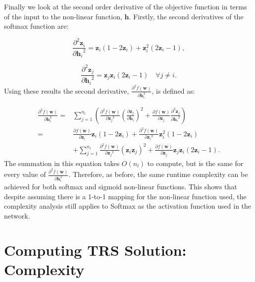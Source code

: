 \documentclass[letterpaper,12pt,titlepage,oneside,final]{book}
\begin{document}
	Finally we look at the second order derivative of the objective function in terms of the input to the non-linear function, $\mathbf{h}$. Firstly, the second derivatives of the softmax function are:
	
	\begin{equation}
	\frac{\partial^{2}{\mathbf{z}_{i}}}{\partial{\mathbf{h}_{i}}^{2}} = \mathbf{z}_{i}(1 - 2\mathbf{z}_{i}) + \mathbf{z}_{i}^2(2\mathbf{z}_{i} - 1) ,
	\end{equation}
	
	\begin{equation}
	\frac{\partial^{2}{\mathbf{z}_{j}}}{\partial{\mathbf{h}_{i}}^{2}} = \mathbf{z}_{j}\mathbf{z}_{i}(2\mathbf{z}_{i}-1) \quad \forall j \neq i.
	\end{equation}
	Using these results the second derivative, $\frac{\partial^{2}{f(\mathbf{w})}}{\partial{\mathbf{h}_{i}^{2}}}$, is defined as:
	
	\begin{equation}
	\begin{split}
	\frac{\partial^{2}{f(\mathbf{w})}}{\partial{\mathbf{h}_{i}^{2}}} = &\sum_{j = 1}^{n_{l}}({\frac{\partial^{2}{f(\mathbf{w})}}{\partial{\mathbf{z}_{j}}^{2}}(\frac{\partial{\mathbf{z}_{j}}}{\partial{\mathbf{h}_{i}}})^{2} +\frac{\partial{f(\mathbf{w})}}{\partial{\mathbf{z}_{j}}}\frac{\partial^{2}{\mathbf{z}_{j}}}{\partial{\mathbf{h}_{i}}^{2}}}) \\ = & \frac{\partial{f(\mathbf{w})}}{\partial{\mathbf{z}_{i}}}\mathbf{z}_{i}(1 - 2\mathbf{z}_{i})+\frac{\partial^{2}{f(\mathbf{w})}}{\partial{\mathbf{z}_{i}}^{2}}\mathbf{z}_{i}^{2}(1-2\mathbf{z}_{i})\\ &  + \sum_{j = 1}^{n_{l}}{\frac{\partial^{2}{f(\mathbf{w})}}{\partial{\mathbf{z}_{j}}^{2}}(\mathbf{z}_{i}\mathbf{z}_{j})^{2}} +\frac{\partial{f(\mathbf{w})}}{\partial{\mathbf{z}_{j}}}\mathbf{z}_{j}\mathbf{z}_{i}(2\mathbf{z}_{i}-1).
	\end{split}
	\end{equation}
	The summation in this equation takes $O(n_{l})$ to compute, but is the same for every value of $\frac{\partial^{2}{f(\mathbf{w})}}{\partial{\mathbf{h}_{i}^{2}}}$. Therefore, as before, the same runtime complexity can be achieved for both softmax and sigmoid non-linear functions. This shows that despite assuming there is a 1-to-1 mapping for the non-linear function used, the complexity analysis still applies to Softmax as the activation function used in the network.
	
	\section{Computing TRS Solution: Complexity}
	
\end{document}

